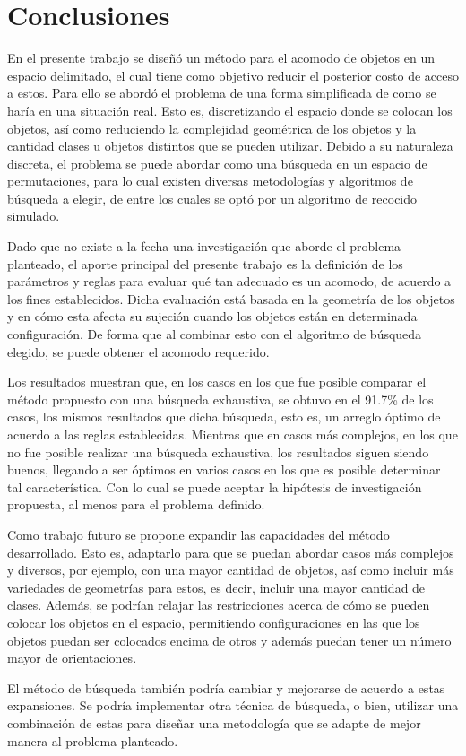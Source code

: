 \chapter{Conclusiones}\label{chap:conclusiones}
%
%
En el presente trabajo se diseñó un método para el acomodo de objetos en un espacio delimitado, el cual tiene como objetivo reducir el posterior costo de acceso a estos.
Para ello se abordó el problema de una forma simplificada de como se haría en una situación real.
Esto es, discretizando el espacio donde se colocan los objetos, así como reduciendo la complejidad geométrica de los objetos y la cantidad clases u objetos distintos que se pueden utilizar.
Debido a su naturaleza discreta, el problema se puede abordar como una búsqueda en un espacio de permutaciones, para lo cual existen diversas metodologías y algoritmos de búsqueda a elegir, de entre los cuales se optó por un algoritmo de recocido simulado.

Dado que no existe a la fecha una investigación que aborde el problema planteado, el aporte principal del presente trabajo es la definición de los parámetros y reglas para evaluar qué tan adecuado es un acomodo, de acuerdo a los fines establecidos.
Dicha evaluación está basada en la geometría de los objetos y en cómo esta afecta su sujeción cuando los objetos están en determinada configuración.
De forma que al combinar esto con el algoritmo de búsqueda elegido, se puede obtener el acomodo requerido.

Los resultados muestran que, en los casos en los que fue posible comparar el método propuesto con una búsqueda exhaustiva, se obtuvo en el 91.7\% de los casos, los mismos resultados que dicha búsqueda, esto es, un arreglo óptimo de acuerdo a las reglas establecidas.
Mientras que en casos más complejos, en los que no fue posible realizar una búsqueda exhaustiva, los resultados siguen siendo buenos, llegando a ser óptimos en varios casos en los que es posible determinar tal característica.
Con lo cual se puede aceptar la hipótesis de investigación propuesta, al menos para el problema definido.

Como trabajo futuro se propone expandir las capacidades del método desarrollado.
Esto es, adaptarlo para que se puedan abordar casos más complejos y diversos, por ejemplo, con una mayor cantidad de objetos, así como incluir más variedades de geometrías para estos, es decir, incluir una mayor cantidad de clases.
Además, se podrían relajar las restricciones acerca de cómo se pueden colocar los objetos en el espacio, permitiendo configuraciones en las que los objetos puedan ser colocados encima de otros y además puedan tener un número mayor de orientaciones.

El método de búsqueda también podría cambiar y mejorarse de acuerdo a estas expansiones.
Se podría implementar otra técnica de búsqueda, o bien, utilizar una combinación de estas para diseñar una metodología que se adapte de mejor manera al problema planteado.